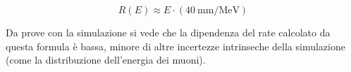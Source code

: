 \begin{equation}
	R(E) \approx  E\cdot\left(\SI{40}{\mm\per\MeV}\right)
	\label{eq:range_elec}
\end{equation}

Da prove con la simulazione si vede che la dipendenza del rate calcolato da questa formula \`e bassa, minore di altre incertezze intrinseche della simulazione (come la distribuzione dell'energia dei muoni).

